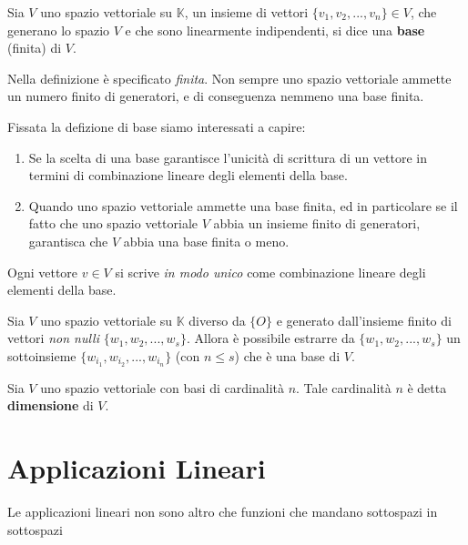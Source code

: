 \begin{definition}
	Sia $V$ uno spazio vettoriale su $\mathbb{K}$, un insieme di vettori
	$\{v_1, v_2, ..., v_n\} \in V$, che generano lo spazio $V$ e che sono
	linearmente indipendenti, si dice una \textbf{base} (finita) di $V$.
\end{definition}

\begin{observation}
	Nella definizione \`e specificato \emph{finita}. Non sempre uno
	spazio vettoriale ammette un numero finito di generatori, e di
	conseguenza nemmeno una base finita.
\end{observation}

Fissata la defizione di base siamo interessati a capire:
\begin{enumerate}
	\item
	      Se la scelta di una base garantisce l'unicit\`a di scrittura di un vettore
	      in termini di combinazione lineare degli elementi della base.
	\item
	      Quando uno spazio vettoriale ammette una base finita, ed in
	      particolare se il fatto che uno spazio vettoriale $V$ abbia un
	      insieme finito di generatori, garantisca che $V$ abbia una
	      base finita o meno.
\end{enumerate}

\begin{proposition}
	Ogni vettore $v \in V$ si scrive \emph{in modo unico} come
	combinazione lineare degli elementi della base.
\end{proposition}

\begin{theorem}
	Sia $V$ uno spazio vettoriale su $\mathbb{K}$ diverso da $\{O\}$
	e generato dall'insieme finito di vettori \emph{non nulli}
	$\{w_1, w_2, ..., w_s\}$. Allora \`e possibile estrarre da
	$\{w_1, w_2, ..., w_s\}$ un sottoinsieme
	$\{w_{i_1}, w_{i_2}, ..., w_{i_n}\}$ (con $n \leq s$) che \`e
	una base di $V$.
\end{theorem}

\begin{definition}
	Sia $V$  uno spazio vettoriale con basi di cardinalit\`a $n$.
	Tale cardinalit\`a $n$ \`e detta \textbf{dimensione} di $V$.
\end{definition}

\section{Applicazioni Lineari}
Le applicazioni lineari non sono altro che funzioni che mandano
sottospazi in sottospazi

